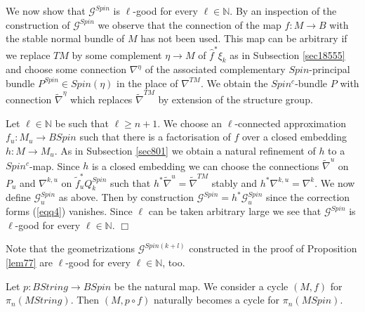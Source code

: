 \documentclass[12pt]{article}
\newcommand{\cG}{{\mathcal{G}}}
\def\hB{\hspace*{\fill}$\Box$ \newline\noindent}
\newcommand{\nat}{{\mathbb{N}}}
\begin{document}
 \bigskip
 
 
  We now show that $\cG^{Spin}$ is $\ell$-good for every $\ell\in \nat$.  By an inspection of the construction of $\cG^{Spin}$  we observe that the connection of the map $f:M\to B$ with the stable normal bundle of $M$ has not been used. This map can be arbitrary if we replace $TM$ by some complement $\eta\to M$ of $\hat f^{*}\xi_{k}$ as in  Subsection \ref{sec18555} and choose some connection $ \nabla^{\eta}$ of the associated complementary $Spin$-principal bundle $P^{Spin}\in Spin(\eta)$ in the place of $\nabla^{TM}$. We obtain the $Spin^{c}$-bundle $P$ with connection
 $\tilde \nabla^{\eta}$ which replaces $\tilde \nabla^{TM}$ by extension of the structure group.


Let $\ell\in \nat $ be such that $\ell\ge n+1$.
We choose an $\ell$-connected approximation $f_{u}:M_{u}\to BSpin$ such that there is a factorisation of $f$ over a closed embedding $h:M\to  M_{u}$. As in Subsection \ref{sec801} we obtain
a natural refinement of $h$ to a $Spin^{c}$-map. Since $h$ is a closed embedding we can choose the
connections $\tilde \nabla^{u}$ on $P_{u}$ and $\nabla^{k,u}$ on $\tilde f_{u}^{*}Q^{Spin}_{k}$ such that
$h^{*}\tilde \nabla^{u}=\tilde \nabla^{TM}$ stably  and $h^{*}\nabla^{k,u}=\nabla^{k}$.
  We now define
$\cG^{Spin}_{u}$ as above. Then by construction
$\cG^{Spin}=h^{*}\cG_{u}^{Spin}$ since the correction forms (\ref{eqq4})
vanishes.
Since $\ell$ can be taken arbitrary large we see that $\cG^{Spin}$ is $\ell$-good for every $\ell\in \nat$. 
\hB 

 Note that the geometrizations $\cG^{Spin(k+l)}$ constructed in the proof of Proposition \ref{lem77}
 are $\ell$-good for every $\ell\in \nat$, too.
 
 
 \bigskip
 
Let   $p:BString\to BSpin$ be the natural map. We  consider a cycle
$(M,f)$ for $\pi_{n}(MString)$.  Then $(M,p\circ f)$ naturally becomes a cycle for $\pi_{n}(MSpin)$.
 
\end{document}
